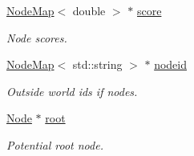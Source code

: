\begin{DoxyCompactItemize}
\hyperlink{namespacederegnet_ae102b707ae1d6f83c639ece5e0dd5658}{Node\+Map}$<$ double $>$ $\ast$ \hyperlink{classderegnet_1_1DeregnetModel_a46224b0bda5bab796d3b7cb41c184a4d}{score}
\begin{DoxyCompactList}\small\item\em Node scores. \end{DoxyCompactList}\item 
\hyperlink{namespacederegnet_ae102b707ae1d6f83c639ece5e0dd5658}{Node\+Map}$<$ std\+::string $>$ $\ast$ \hyperlink{classderegnet_1_1DeregnetModel_adfebf6f9983c9ccc934469a79381fb78}{nodeid}
\begin{DoxyCompactList}\small\item\em Outside world ids if nodes. \end{DoxyCompactList}\item 
\hyperlink{namespacederegnet_a744bad34f2de9856d36715a445f027f3}{Node} $\ast$ \hyperlink{classderegnet_1_1DeregnetModel_a54b20393a0e26d65935d387685d7fe96}{root}
\begin{DoxyCompactList}\small\item\em Potential root node. \end{DoxyCompactList}\end{DoxyCompactItemize}
